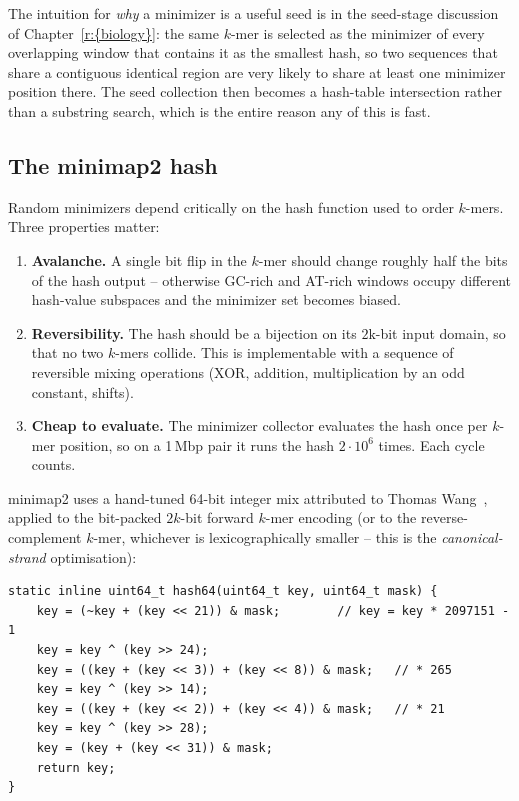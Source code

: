 The intuition for \emph{why} a minimizer is a useful seed is in the
seed-stage discussion of Chapter~\ref{r:{biology}}:
the same $k$-mer is selected as the minimizer of every
overlapping window that contains it as the smallest hash, so two
sequences that share a contiguous identical region are very likely
to share at least one minimizer position there. The seed
collection then becomes a hash-table intersection rather than a
substring search, which is the entire reason any of this is fast.

\subsection{The minimap2 hash}
\label{sec:hash64}

Random minimizers depend critically on the hash function used to
order $k$-mers.  Three properties matter:

\begin{enumerate}
\item \textbf{Avalanche.} A single bit flip in the $k$-mer should
  change roughly half the bits of the hash output -- otherwise
  GC-rich and AT-rich windows occupy different
  hash-value subspaces and the minimizer set becomes biased.
\item \textbf{Reversibility.} The hash should be a
  bijection on its $\mathrm{2k}$-bit input domain, so that no two
  $k$-mers collide.  This is implementable with a sequence of
  reversible mixing operations
  (XOR, addition, multiplication by an odd constant, shifts).
\item \textbf{Cheap to evaluate.} The minimizer collector evaluates
  the hash once per $k$-mer position, so on a 1\,Mbp pair it runs
  the hash $2 \cdot 10^6$ times. Each cycle counts.
\end{enumerate}

minimap2 uses a hand-tuned 64-bit integer mix attributed to Thomas
Wang~\cite{wang_inthash}, applied to the bit-packed
$2k$-bit forward $k$-mer encoding (or to the reverse-complement
$k$-mer, whichever is lexicographically smaller -- this is the
\emph{canonical-strand} optimisation):

\begin{verbatim}
static inline uint64_t hash64(uint64_t key, uint64_t mask) {
    key = (~key + (key << 21)) & mask;        // key = key * 2097151 - 1
    key = key ^ (key >> 24);
    key = ((key + (key << 3)) + (key << 8)) & mask;   // * 265
    key = key ^ (key >> 14);
    key = ((key + (key << 2)) + (key << 4)) & mask;   // * 21
    key = key ^ (key >> 28);
    key = (key + (key << 31)) & mask;
    return key;
}
\end{verbatim}


